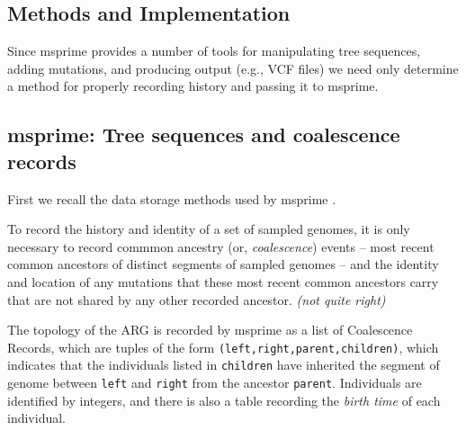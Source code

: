 \documentclass{bioinfo}
\newcommand{\plr}[1]{{\color{blue}\it #1}}
\begin{document}
\begin{methods}
\section{Methods and Implementation}

Since msprime provides a number of tools for manipulating tree sequences,
adding mutations,
and producing output (e.g., VCF files)
we need only determine a method for properly recording history and passing it to msprime.

\subsection{msprime: Tree sequences and coalescence records}

First we recall the data storage methods used by msprime \citep[see][for more details]{msprime}.

To record the history and identity of a set of sampled genomes,
it is only necessary to record commmon ancestry (or, \emph{coalescence}) events --
most recent common ancestors of distinct segments of sampled genomes --
and the identity and location of any mutations that these most recent common ancestors carry
that are not shared by any other recorded ancestor.
\plr{(not quite right)}

The topology of the ARG
is recorded by msprime as a list of Coalescence Records, which are tuples of the form
\texttt{(left,right,parent,children)},
which indicates that the individuals listed in \texttt{children}
have inherited the segment of genome between \texttt{left} and \texttt{right}
from the ancestor \texttt{parent}.
Individuals are identified by integers,
and there is also a table recording the \emph{birth time} of each individual.


\end{methods}
\end{document}
